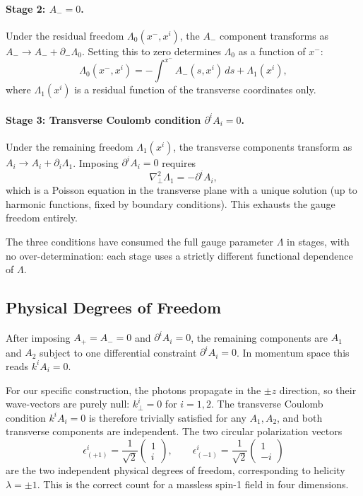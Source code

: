\documentclass[12pt,a4paper]{article}
\begin{document}
\paragraph{Stage 2: $A_- = 0$.}
Under the residual freedom $\Lambda_0(x^-, x^i)$, the $A_-$ component transforms as
$A_- \to A_- + \partial_-\Lambda_0$. Setting this to zero determines $\Lambda_0$ as a 
function of $x^-$:
\begin{equation}
    \Lambda_0(x^-, x^i) = -\int^{x^-} A_-(s, x^i)\,ds + \Lambda_1(x^i),
\end{equation}
where $\Lambda_1(x^i)$ is a residual function of the transverse coordinates only.

\paragraph{Stage 3: Transverse Coulomb condition $\partial^i A_i = 0$.}
Under the remaining freedom $\Lambda_1(x^i)$, the transverse components transform as 
$A_i \to A_i + \partial_i\Lambda_1$. Imposing $\partial^i A_i = 0$ requires
\begin{equation}
    \nabla^2_\perp\Lambda_1 = -\partial^i A_i,
\end{equation}
which is a Poisson equation in the transverse plane with a unique solution (up to 
harmonic functions, fixed by boundary conditions). This exhausts the gauge freedom 
entirely.

The three conditions have consumed the full gauge parameter $\Lambda$ in stages, 
with no over-determination: each stage uses a strictly different functional 
dependence of $\Lambda$.

\subsection{Physical Degrees of Freedom}

After imposing $A_+ = A_- = 0$ and $\partial^i A_i = 0$, the remaining components 
are $A_1$ and $A_2$ subject to one differential constraint $\partial^i A_i = 0$. 
In momentum space this reads $k^i A_i = 0$.

For our specific construction, the photons propagate in the $\pm z$ direction, 
so their wave-vectors are purely null: $k^i_\perp = 0$ for $i = 1,2$. The 
transverse Coulomb condition $k^i A_i = 0$ is therefore trivially satisfied for 
any $A_1, A_2$, and both transverse components are independent. The two circular 
polarization vectors
\begin{equation}
    \epsilon^i_{(+1)} = \frac{1}{\sqrt{2}}\begin{pmatrix}1\\i\end{pmatrix}, \qquad
    \epsilon^i_{(-1)} = \frac{1}{\sqrt{2}}\begin{pmatrix}1\\-i\end{pmatrix}
\end{equation}
are the two independent physical degrees of freedom, corresponding to helicity 
$\lambda = \pm 1$. This is the correct count for a massless spin-1 field in four 
dimensions.
\end{document}
